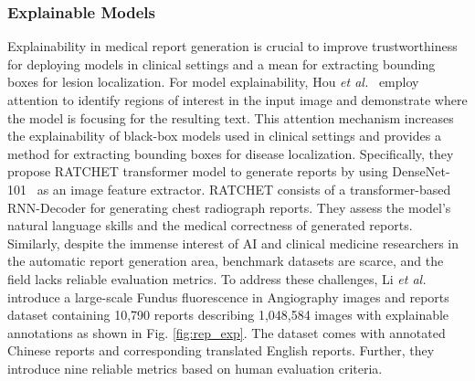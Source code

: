 \documentclass[10pt,journal,compsoc]{IEEEtran}
\begin{document}
\subsubsection{{{\textbf{Explainable Models}}}}
Explainability in medical report generation is crucial to improve trustworthiness for deploying models in clinical settings and a mean for extracting bounding boxes for lesion localization.
For model explainability, Hou \textit{et al.}~\cite{hou2021ratchet}  employ attention to identify regions of interest in the input image and demonstrate where the model is focusing for the resulting text. This attention mechanism increases the explainability of black-box models used in clinical settings and provides a method for extracting bounding boxes for disease localization. 
Specifically, they propose RATCHET transformer model to generate reports by using DenseNet-101~\cite{huang2017densely} as an image feature extractor. RATCHET consists of a transformer-based RNN-Decoder for generating chest radiograph reports. 
They assess the model's natural language skills and the medical correctness of generated reports. %
Similarly, despite the immense interest of AI and clinical medicine researchers in the automatic report generation area, benchmark datasets are scarce, and the field lacks reliable evaluation metrics. To address these challenges, Li \textit{et al.}~\cite{li2021ffa} introduce a large-scale Fundus fluorescence in Angiography images and reports dataset containing 10,790 reports describing 1,048,584 images with explainable annotations as shown in Fig. \ref{fig:rep_exp}. The dataset comes with annotated Chinese reports and corresponding translated English reports. Further, they introduce nine reliable metrics based on human evaluation criteria. %
\end{document}
